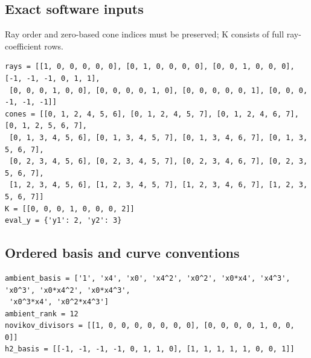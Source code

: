 \documentclass[10pt,a4paper]{article}
\begin{document}
\subsection*{Exact software inputs}
Ray order and zero-based cone indices must be preserved; K consists of full ray-coefficient rows.
\begin{lstlisting}
rays = [[1, 0, 0, 0, 0, 0], [0, 1, 0, 0, 0, 0], [0, 0, 1, 0, 0, 0], [-1, -1, -1, 0, 1, 1],
 [0, 0, 0, 1, 0, 0], [0, 0, 0, 0, 1, 0], [0, 0, 0, 0, 0, 1], [0, 0, 0, -1, -1, -1]]
cones = [[0, 1, 2, 4, 5, 6], [0, 1, 2, 4, 5, 7], [0, 1, 2, 4, 6, 7], [0, 1, 2, 5, 6, 7],
 [0, 1, 3, 4, 5, 6], [0, 1, 3, 4, 5, 7], [0, 1, 3, 4, 6, 7], [0, 1, 3, 5, 6, 7],
 [0, 2, 3, 4, 5, 6], [0, 2, 3, 4, 5, 7], [0, 2, 3, 4, 6, 7], [0, 2, 3, 5, 6, 7],
 [1, 2, 3, 4, 5, 6], [1, 2, 3, 4, 5, 7], [1, 2, 3, 4, 6, 7], [1, 2, 3, 5, 6, 7]]
K = [[0, 0, 0, 1, 0, 0, 0, 2]]
eval_y = {'y1': 2, 'y2': 3}
\end{lstlisting}
\subsection*{Ordered basis and curve conventions}
\begin{lstlisting}
ambient_basis = ['1', 'x4', 'x0', 'x4^2', 'x0^2', 'x0*x4', 'x4^3', 'x0^3', 'x0*x4^2', 'x0*x4^3',
 'x0^3*x4', 'x0^2*x4^3']
ambient_rank = 12
novikov_divisors = [[1, 0, 0, 0, 0, 0, 0, 0], [0, 0, 0, 0, 1, 0, 0, 0]]
h2_basis = [[-1, -1, -1, -1, 0, 1, 1, 0], [1, 1, 1, 1, 1, 0, 0, 1]]
\end{lstlisting}
\end{document}
